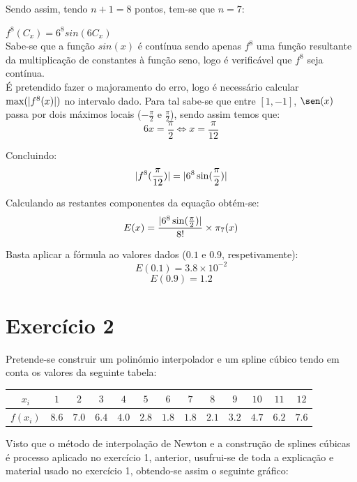 \documentclass[12pt, letterpaper,fleqn]{article}
\DeclarePairedDelimiter\abs{\lvert}{\rvert}%
\begin{document}
\begin{itemize}
\begin{itemize}
            Sendo assim, tendo $n+1 = 8$ pontos, tem-se que $n = 7$:

            $f^8(C_x) = 6^8sin(6C_x)$ \\

            Sabe-se que a função $sin(x)$ é contínua sendo apenas $f^8$ uma função resultante da multiplicação de constantes à função seno, logo é verificável que $f^8$ seja contínua. \\

            É pretendido fazer o majoramento do erro, logo é necessário calcular $\max(\abs{f^8(x)})$ no intervalo dado. Para tal sabe-se que entre $[1,-1]$, $\sen(x)$ passa por dois máximos locais ($-\frac{\pi}{2}$ e $\frac{\pi}{2}$), sendo assim temos que:
            \[6x = \frac{\pi}{2} \Leftrightarrow x = \frac{\pi}{12}\]

            Concluindo:
            \[\abs{f^8(\frac{\pi}{12})} = \abs{6^8\sin(\frac{\pi}{2})}\]

            Calculando as restantes componentes da equação obtém-se:
            \[E(x) = \frac{\abs{6^8\sin(\frac{\pi}{2})}}{8!}\times \pi_7(x)\]

            Basta aplicar a fórmula ao valores dados ($0.1$ e $0.9$, respetivamente):
            \[E(0.1) = 3.8\times 10^{-2}\]
            \[E(0.9) = 1.2\]
    \end{itemize}
\end{itemize}

\section*{Exercício 2}

Pretende-se construir um polinómio interpolador e um spline cúbico tendo em conta os valores da seguinte tabela:

\begin{center}
    \begin{tabular} {|| c | c | c | c | c | c | c | c | c | c | c | c | c ||} \hline
        $x_i$ & $1$ & $2$ & $3$ & $4$ & $5$ & $6$ & $7$ & $8$ & $9$ & $10$ & $11$ & $12$\\ [0.4ex]\hline
        $f(x_i)$ & $8.6$ & $7.0$ & $6.4$ & $4.0$ & $2.8$ & $1.8$ & $1.8$ & $2.1$ & $3.2$ & $4.7$ & $6.2$ & $7.6$ \\ [0.4ex]\hline
    \end{tabular}
\end{center}

Visto que o método de interpolação de Newton e a construção de splines cúbicas é processo aplicado no exercício 1, anterior, usufrui-se de toda a explicação e material usado no exercício 1, obtendo-se assim o seguinte gráfico:
\end{document}
